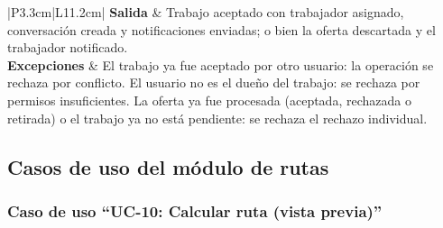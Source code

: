 \documentclass[doc,12pt,a4paper]{apa7}
\begin{document}
\begin{longtable}{|P{3.3cm}|L{11.2cm}|}
\textbf{Salida} & Trabajo aceptado con trabajador asignado, conversación creada y notificaciones enviadas; o bien la oferta descartada y el trabajador notificado. \\ \hline
\textbf{Excepciones} & El trabajo ya fue aceptado por otro usuario: la operación se rechaza por conflicto. El usuario no es el dueño del trabajo: se rechaza por permisos insuficientes. La oferta ya fue procesada (aceptada, rechazada o retirada) o el trabajo ya no está pendiente: se rechaza el rechazo individual. \\ \hline
\end{longtable}

\subsection{Casos de uso del módulo de rutas}

\subsubsection{Caso de uso ``UC-10: Calcular ruta (vista previa)''}
\end{document}
